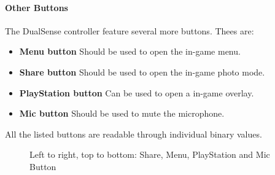 \paragraph{Other Buttons}
The DualSense controller feature several more buttons. Thees are:
\begin{itemize}
	\item \textbf{Menu button} Should be used to open the in-game menu.
	\item \textbf{Share button} Should be used to open the in-game photo mode.
	\item \textbf{PlayStation button} Can be used to open a in-game overlay.
	\item \textbf{Mic button} Should be used to mute the microphone.
\end{itemize}
All the listed buttons are readable through individual binary values.
\begin{figure}[H]
    \centering
    \caption{Left to right, top to bottom: Share, Menu, PlayStation and Mic Button}
\end{figure}

